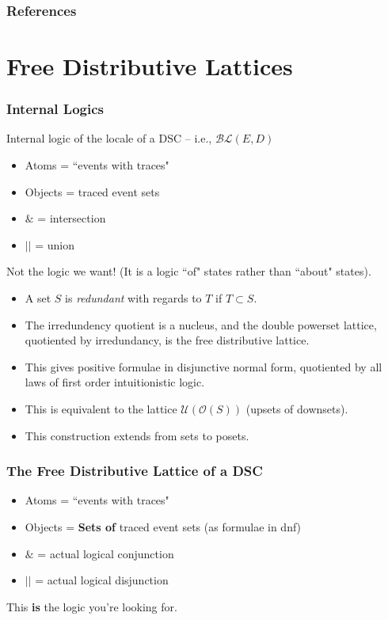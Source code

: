 \documentclass{beamer}
\newcommand{\Oc}{\mathcal{O}}
\newcommand{\Ucc}{\mathcal{U}}
\newcommand{\BLc}{\mathcal{BL}}
\begin{document}
\begin{frame}[allowframebreaks]
        \frametitle{References}
         \nocite{*}
        
	
\end{frame}

\section{Free Distributive Lattices}
\begin{frame}
\frametitle{Internal Logics}
Internal logic of the locale of a DSC  -- i.e., \(\BLc(E,D)\)
\begin{itemize}
\item Atoms = ``events with traces"
\item Objects = traced event sets
\item \(\&\) = intersection
\item \(||\) = union
\end{itemize}

Not the logic we want! (It is a logic ``of" states rather than ``about" states).
\end{frame}

\begin{frame}
\begin{itemize}
\item A set \(S\) is \textit{redundant} with regards to \(T\) if \(T \subset S\).
\item The irredundency quotient is a nucleus, and the double powerset lattice, quotiented by irredundancy, is the free distributive lattice.
\item This gives positive formulae in disjunctive normal form, quotiented by all laws of first order intuitionistic logic.
\item This is equivalent to the lattice \(\Ucc(\Oc(S))\) (upsets of downsets).
\item This construction extends from sets to posets.
\end{itemize}
\end{frame}

\begin{frame}
\frametitle{The Free Distributive Lattice of a DSC}

\begin{itemize}
\item Atoms = ``events with traces"
\item Objects = \textbf{Sets of} traced event sets (as formulae in dnf)
\item \(\&\) = actual logical conjunction
\item \(||\) = actual logical disjunction
\end{itemize}

This \textbf{is} the logic you're looking for.

\end{frame}
\end{document}
